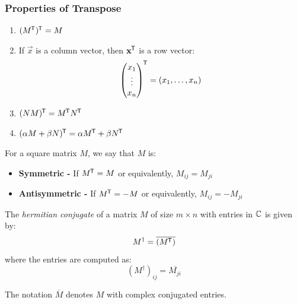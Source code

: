 \documentclass[../main.tex]{subfiles}
\begin{document}
\subsubsection{Properties of Transpose}
\begin{enumerate}
  \item $(M^{{\mkern-1.5mu\mathsf{T}}})^{{\mkern-1.5mu\mathsf{T}}} = M$
  \item If $\vec{x}$ is a column vector, then $\mathbf{\bm{x}}^{{\mkern-1.5mu\mathsf{T}}}$ is a row vector:
    \[
      \begin{pmatrix}
      x_1 \\
      \vdots \\
      x_n \\
      \end{pmatrix}^{{\mkern-1.5mu\mathsf{T}}} =
      (x_1, \ldots, x_n)
    \]
  \item $(NM)^{{\mkern-1.5mu\mathsf{T}}} = M^{{\mkern-1.5mu\mathsf{T}}}N^{{\mkern-1.5mu\mathsf{T}}}$
  \item $(\alpha M + \beta N)^{{\mkern-1.5mu\mathsf{T}}} = \alpha M^{{\mkern-1.5mu\mathsf{T}}} + \beta N^{{\mkern-1.5mu\mathsf{T}}}$
\end{enumerate}
\begin{definition}
  For a square matrix $M$, we say that $M$ is:
  \begin{itemize}
    \item \textbf{Symmetric -} If $M^{{\mkern-1.5mu\mathsf{T}}} = M$ or equivalently, $M_{i j} = M_{j i}$
    \item \textbf{Antisymmetric -} If $M^{{\mkern-1.5mu\mathsf{T}}} = -M$ or equivalently, $M_{i j} = -M_{j i}$
  \end{itemize}
\end{definition}
\begin{definition}
  The \textit{hermitian conjugate} of a matrix $M$ of size $m \times n$ with entries in $\mathbb{C}$ is given by:
  \[
    M^{\dag} = \overline{(M^{{\mkern-1.5mu\mathsf{T}}})}
  \]
  where the entries are computed as:
  \[
    (M^{\dag})_{i j} = \overline{M_{j i}}
  \]
\end{definition}
\begin{remark}[Notation]
  The notation $\overline{M}$ denotes $M$ with complex conjugated entries.
\end{remark}
\end{document}
